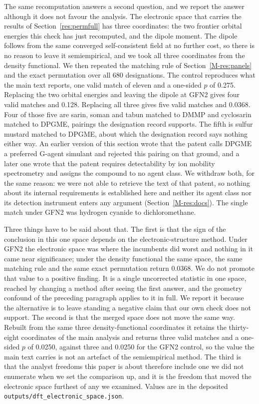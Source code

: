 \documentclass[journal=jacsat,manuscript=suppinfo,margin=1in]{achemso}
\begin{document}
The same recomputation answers a second question, and we report the answer
although it does not favour the analysis. The electronic space that carries the
results of Section~\ref{res:permfull} has three coordinates: the two frontier
orbital energies this check has just recomputed, and the dipole moment. The
dipole follows from the same converged self-consistent field at no further cost,
so there is no reason to leave it semiempirical, and we took all three
coordinates from the density functional. We then repeated the matching rule of
Section~\ref{M-res:panels} and the exact permutation over all 680 designations.
The control reproduces what the main text reports, one valid match of eleven and
a one-sided $p$ of 0.275. Replacing the two orbital energies and leaving the
dipole at GFN2 gives four valid matches and 0.128. Replacing all three gives
five valid matches and 0.0368. Four of those five are sarin, soman and tabun
matched to DMMP and cyclosarin matched to DPGME, pairings the designation record
supports. The fifth is sulfur mustard matched to DPGME, about
which the designation record says nothing either way. An earlier version of
this section wrote that the patent calls DPGME a preferred G-agent simulant and
rejected this pairing on that ground, and a later one wrote that the patent
requires detectability by ion mobility spectrometry and assigns the compound to
no agent class. We withdraw both, for the same reason: we were not able to
retrieve the text of that patent, so nothing about its internal requirements is
established here and neither its agent class nor its detection instrument
enters any argument (Section~\ref{M-res:docs}). The single match under GFN2 was hydrogen cyanide to
dichloromethane.

Three things have to be said about that. The first is that the sign of the
conclusion in this one space depends on the electronic-structure method. Under
GFN2 the electronic space was where the incumbents did worst and nothing in it
came near significance; under the density functional the same space, the same
matching rule and the same exact permutation return 0.0368. We do not promote
that value to a positive finding. It is a single uncorrected statistic in one
space, reached by changing a method after seeing the first answer, and the
geometry confound of the preceding paragraph applies to it in full. We report it
because the alternative is to leave standing a negative claim that our own check
does not support. The second is that the merged space does not move the same
way. Rebuilt from the same three density-functional coordinates it retains the
thirty-eight coordinates of the main analysis and returns three valid matches and
a one-sided $p$ of 0.0250, against three and 0.0250 for the GFN2 control, so the
value the main text carries is not an artefact of the semiempirical method. The
third is that the analyst freedoms this paper is about therefore include one we
did not enumerate when we set the comparison up, and it is the freedom that
moved the electronic space furthest of any we examined. Values are in the
deposited \texttt{outputs/dft\_electronic\_space.json}.
\end{document}
